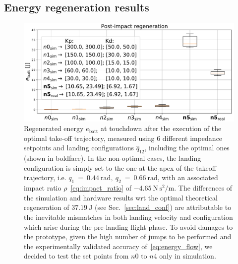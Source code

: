 \subsection{Energy regeneration results}
\begin{figure}[t]
    \centering
    \includegraphics[width=1\columnwidth]{images/opt_vs_non_opt_conf.pdf}
    \caption{Regenerated energy $e_{\mathrm{batt}}$ at touchdown after the execution of the optimal take-off trajectory, measured using 6 different impedance setpoints and landing configurations $\hat{q}_{12}$, including the optimal ones (shown in boldface). In the non-optimal cases, the landing configuration is simply set to the one at the apex of the takeoff trajectory, i.e. $q_1~=~0.44~\mathrm{rad},~q_2~=~0.66~\mathrm{rad}$, with an associated impact ratio $\rho$~\eqref{eq:impact_ratio} of $-4.65~\mathrm{N\,s^2/m}$. 
   	The differences of the simulation and hardware results wrt the optimal theoretical regeneration of $37.19~\mathrm{J}$ (see Sec.~\ref{sec:land_conf}) are attributable to the inevitable mismatches in both landing velocity and configuration which arise during the pre-landing flight phase. To avoid damages to the prototype, given the high number of jumps to be performed and the experimentally validated accuracy of~\eqref{eq:energy_flow}, we decided to test the set points from $n0$ to $n4$ only in simulation.}
    \label{fig:energy_rec_comp}
\end{figure}
